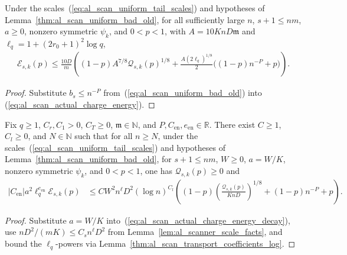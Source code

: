\begin{lemma}
    \label{thm:al_scan_actual_charge_energy_decay}
    \leanok
    Under the scales~(\ref{eq:al_scan_uniform_tail_scales}) and hypotheses of
    Lemma~\ref{thm:al_scan_uniform_bad_old}, for all sufficiently large $n$,
    $s+1\le nm$, $a\ge0$, nonzero symmetric $\psi_k$, and $0<p<1$, with
    $A=10KnD\mathfrak m$ and $\ell_q=1+(2r_0+1)^2\log q$,
    \begin{align}
        \mathcal E_{s,k}(p)\le\frac{10D}{m}
        \left((1-p)A^{7/8}\mathcal Q_{s,k}(p)^{1/8}
        +\frac{A(2\ell_q)^{1/8}}2\bigl((1-p)n^{-P}+p\bigr)\right).
        \label{eq:al_scan_actual_charge_energy_decay}
    \end{align}
\end{lemma}
\begin{proof}\leanok
    Substitute $b_s\le n^{-P}$ from~(\ref{eq:al_scan_uniform_bad_old}) into
    (\ref{eq:al_scan_actual_charge_energy}).
\end{proof}

\begin{lemma}
    \label{thm:al_scan_actual_charge_energy_coefficients}
    \leanok
    Fix $q\ge1$, $C_r,C_1>0$, $C_T\ge0$, $\mathfrak m\in\mathbb N$, and
    $P,C_{\mathrm{en}},e_{\mathrm{en}}\in\mathbb R$. There exist $C\ge1$,
    $C_l\ge0$, and $N\in\mathbb N$ such that for all $n\ge N$, under the
    scales~(\ref{eq:al_scan_uniform_tail_scales}) and hypotheses of
    Lemma~\ref{thm:al_scan_uniform_bad_old}, for $s+1\le nm$, $W\ge0$,
    $a=W/K$, nonzero symmetric $\psi_k$, and $0<p<1$, one has
    $\mathcal Q_{s,k}(p)\ge0$ and
    \begin{align}
        |C_{\mathrm{en}}|a^2\ell_q^{e_{\mathrm{en}}}\mathcal E_{s,k}(p)
         & \le C W^2 n^{\ell}D^2(\log n)^{C_l}
        \left((1-p)\left(\frac{\mathcal Q_{s,k}(p)}{KnD}\right)^{1/8}
        +(1-p)n^{-P}+p\right).
        \label{eq:al_scan_actual_charge_energy_coefficients}
    \end{align}
\end{lemma}
\begin{proof}\leanok
    Substitute $a=W/K$ into~(\ref{eq:al_scan_actual_charge_energy_decay}), use
    $nD^2/(mK)\le C_sn^\ell D^2$ from Lemma~\ref{lem:al_scanner_scale_facts},
    and bound the $\ell_q$-powers via
    Lemma~\ref{thm:al_scan_transport_coefficients_log}.
\end{proof}

